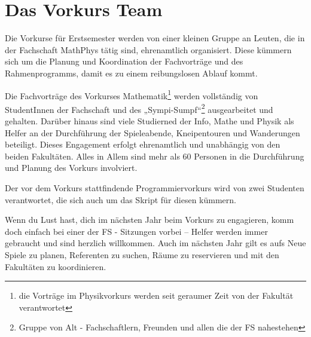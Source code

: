 \section{Das Vorkurs Team}
Die Vorkurse für Erstsemester werden von einer kleinen Gruppe an Leuten, die in der Fachschaft MathPhys tätig sind, ehrenamtlich organisiert. Diese kümmern sich um die Planung und Koordination der Fachvorträge und des Rahmenprogramms, damit es zu einem reibungslosen Ablauf kommt.

Die Fachvorträge des Vorkurses Mathematik\footnote{die Vorträge im Physikvorkurs werden seit geraumer Zeit von der Fakultät verantwortet} werden vollständig von StudentInnen der Fachschaft und des „Sympi-Sumpf“\footnote{Gruppe von Alt - Fachschaftlern, Freunden und allen die der FS nahestehen} ausgearbeitet und gehalten. Darüber hinaus sind viele Studierned der Info, Mathe und Physik als Helfer an der Durchführung der Spieleabende, Kneipentouren und Wanderungen beteiligt. Dieses Engagement erfolgt ehrenamtlich und unabhängig von den beiden Fakultäten. Alles in Allem sind mehr als 60 Personen in die Durchführung und Planung des Vorkurs involviert.

Der vor dem Vorkurs stattfindende Programmiervorkurs wird von zwei Studenten verantwortet, die sich auch um das Skript für diesen kümmern.

Wenn du Lust hast, dich im nächsten Jahr beim Vorkurs zu engagieren, komm doch einfach bei einer der FS - Sitzungen vorbei -- Helfer werden immer gebraucht und sind herzlich willkommen. Auch im nächsten Jahr gilt es aufs Neue Spiele zu planen, Referenten zu suchen, Räume zu reservieren und mit den Fakultäten zu koordinieren.

